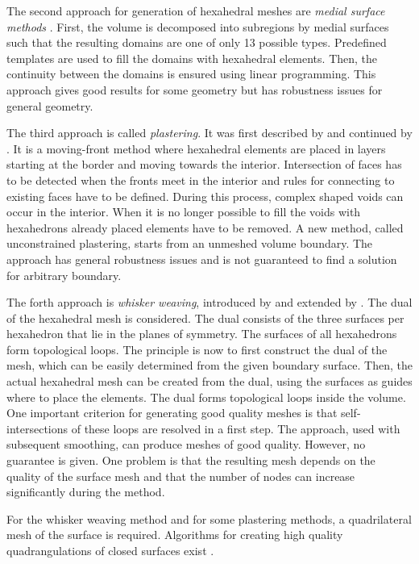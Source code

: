 The second approach for generation of hexahedral meshes are \emph{medial surface methods} \cite{price1995hexahedral, price1997hexahedral}. First, the volume is decomposed into subregions by medial surfaces such that the resulting domains are one of only 13 possible types. Predefined templates are used to fill the domains with hexahedral elements. Then, the continuity between the domains is ensured using linear programming. This approach gives good results for some geometry but has robustness issues for general geometry.

The third approach is called \emph{plastering}. It was first described by \cite{blacker1993seams} and continued by \cite{staten2006unconstrained,staten2010unconstrained}.
It is a moving-front method where hexahedral elements are placed in layers starting at the border and moving towards the interior. Intersection of faces has to be detected when the fronts meet in the interior and rules for connecting to existing faces have to be defined.
During this process, complex shaped voids can occur in the interior. When it is no longer possible to fill the voids with hexahedrons already placed elements have to be removed.
A new method, called unconstrained plastering, starts from an unmeshed volume boundary. The approach has general robustness issues and is not guaranteed to find a solution for arbitrary boundary.

The forth approach is \emph{whisker weaving}, introduced by \cite{tautges1996whisker} and extended by \cite{ledoux2008extension,kawamura2008strategy}. The dual of the hexahedral mesh is considered. The dual consists of the three surfaces per hexahedron that lie in the planes of symmetry. The surfaces of all hexahedrons form topological loops. 
The principle is now to first construct the dual of the mesh, which can be easily determined from the given boundary surface. Then, the actual hexahedral mesh can be created from the dual, using the surfaces as guides where to place the elements.
The dual forms topological loops inside the volume. One important criterion for generating good quality meshes is that self-intersections of these loops are resolved in a first step.
The approach, used with subsequent smoothing, can produce meshes of good quality. However, no guarantee is given. One problem is that the resulting mesh depends on the quality of the surface mesh and that the number of nodes can increase significantly during the method.

For the whisker weaving method and for some plastering methods, a quadrilateral mesh of the surface is required. Algorithms for creating high quality quadrangulations of closed surfaces exist \cite{dong2005quadrangulating,Kovacs2011Anisotropic,Bessmeltsev2012,Meng2016Consistent}.

